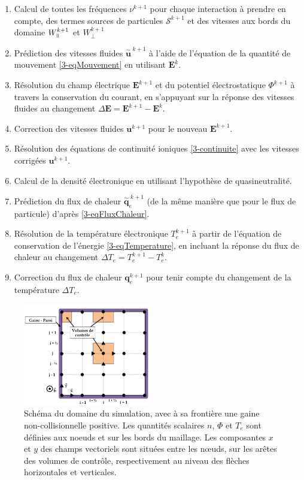 \begin{refsection}
\begin{enumerate}
  \item Calcul de toutes les fréquences $\nu^{k+1}$ pour
  chaque interaction à prendre en compte, des termes sources de particules
  $\mathcal{S}^{k+1}$ et des vitesses aux bords du domaine $W_{\para}^{k+1}$ et
  $W_{\perp}^{k+1}$
  \item Prédiction des vitesses fluides ${\overset{\sim}{\mathbf u}}^{\;k+1}$ à
  l'aide de l'équation de la quantité de mouvement \eqref{3-eqMouvement} en
  utilisant $\mathbf E^{k}$.
  \item Résolution du champ électrique $\mathbf E^{k+1}$ et du potentiel
  électrostatique $\Phi^{k+1}$ à travers la conservation du courant, en
  s'appuyant sur la réponse des vitesses fluides au changement $\Delta \mathbf
  E=\mathbf E^{k+1}-\mathbf E^{k}$.
  \item Correction des vitesses fluides $\mathbf u^{k+1}$ pour le nouveau
  $\mathbf E^{k+1}$.
  \item Résolution des équations de continuité ioniques \eqref{3-continuite} avec les
  vitesses corrigées $\mathbf u^{k+1}$.
  \item Calcul de la densité électronique en utilisant l'hypothèse de
  quasineutralité.
  \item Prédiction du flux de chaleur ${\overset{\sim}{\mathbf q}}_e^{\;k+1}$
  (de la même manière que pour le flux de particule) d'après
  \eqref{3-eqFluxChaleur}.
  \item Résolution de la température électronique $T_e^{k+1}$ à partir de
  l'équation de conservation de l'énergie \eqref{3-eqTemperature}, en incluant la réponse du flux de
  chaleur au changement $\Delta T_e=T_e^{k+1}-T_e^{k}$.
  \item Correction du flux de chaleur $\mathbf
  q_e^{k+1}$ pour tenir compte du changement de la température $\Delta T_e$.
\end{enumerate}

\begin{figure}[!htbp]
\centering
\includegraphics[width=0.5\textwidth]{figures/3-magnisGrid.png}
{\caption{Schéma du domaine du simulation, avec à sa frontière une gaine
non-collisionnelle positive.
Les quantités scalaires $n$, $\Phi$ et $T_e$ sont définies aux noeuds et sur les
bords du maillage. Les composantes $x$ et $y$ des champs vectoriels sont
situées entre les n\oe uds, sur les arêtes des volumes de contrôle,
respectivement au niveau des flèches horizontales et verticales.}
\label{3-maillage}}
\end{figure}


\end{refsection}
